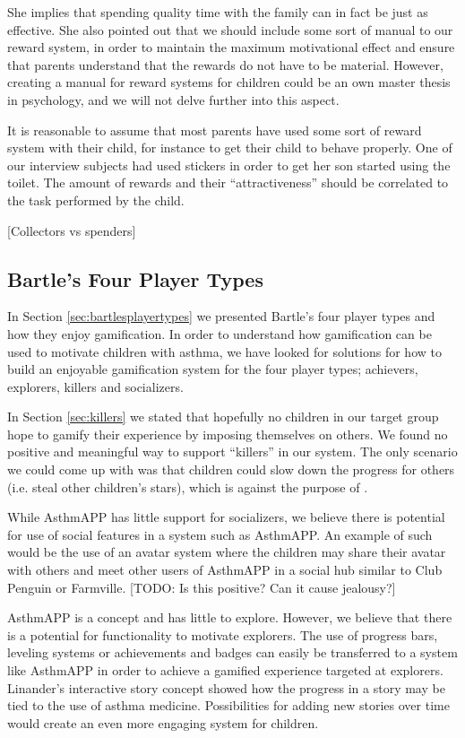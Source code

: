 She implies that spending quality time with the family can in fact be just as effective. She also pointed out that we should include some sort of manual to our reward system, in order to maintain the maximum motivational effect and ensure that parents understand that the rewards do not have to be material. However, creating a manual for reward systems for children could be an own master thesis in psychology, and we will not delve further into this aspect. 

It is reasonable to assume that most parents have used some sort of reward system with their child, for instance to get their child to behave properly. One of our interview subjects had used stickers in order to get her son started using the toilet. The amount of rewards and their ``attractiveness'' should be correlated to the task performed by the child.

[Collectors vs spenders]

\subsection{Bartle's Four Player Types}
In Section \ref{sec:bartlesplayertypes} we presented Bartle's four player types and how they enjoy gamification. In order to understand how gamification can be used to motivate children with asthma, we have looked for solutions for how to build an enjoyable gamification system for the four player types; achievers, explorers, killers and socializers. 

In Section \ref{sec:killers} we stated that hopefully no children in our target group hope to gamify their experience by imposing themselves on others. We found no positive and meaningful way to support ``killers'' in our system. The only scenario we could come up with was that children could slow down the progress for others (i.e. steal other children's stars), which is against the purpose of \app{}.  

While AsthmAPP has little support for socializers, we believe there is potential for use of social features in a system such as AsthmAPP. An example of such would be the use of an avatar system where the children may share their avatar with others and meet other users of AsthmAPP in a social hub similar to Club Penguin or Farmville. 
[TODO: Is this positive? Can it cause jealousy?]

AsthmAPP is a concept and has little to explore. However, we believe that there is a potential for functionality to motivate explorers. The use of progress bars, leveling systems or achievements and badges can easily be transferred to a system like AsthmAPP in order to achieve a gamified experience targeted at explorers. Linander's interactive story concept showed how the progress in a story may be tied to the use of asthma medicine\cite{linander2013utvikling}. Possibilities for adding new stories over time would create an even more engaging system for children. 

